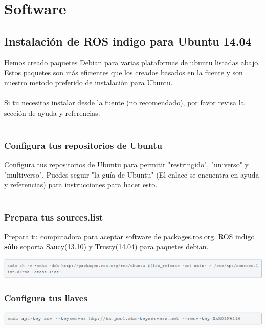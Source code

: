 \documentclass[a4paper]{book}
\begin{document}
\chapter{Software}

\section{Instalación de ROS indigo para Ubuntu 14.04}
Hemos creado paquetes Debian para varias plataformas de ubuntu listadas abajo. Estos paquetes son más eficientes que 
los creados basados en la fuente y son nuestro metodo preferido de instalación para Ubuntu.\\
\\
Si tu necesitas instalar desde la fuente (no recomendado), por favor revisa la sección de ayuda y referencias.\\
\\
\subsection{Configura tus repositorios de Ubuntu}
Configura tus repositorios de Ubuntu para permitir "restringido", "universo" y "multiverso". Puedes seguir "la guía de 
Ubuntu" (El enlace se encuentra en ayuda y referencias) para instrucciones para hacer esto.\\
\\
\subsection{Prepara tus sources.list}
Prepara tu computadora para aceptar software de packages.ros.org. ROS indigo \textbf{sólo} soporta Saucy(13.10) y 
Trusty(14.04) para paquetes debian.

\begin{center}
\includegraphics[width=1\textwidth]{Figures/Software/Install_ROS/Paso_1.png}
\end{center}

\subsection{Configura tus llaves}

\begin{center}
\includegraphics[width=1\textwidth]{Figures/Software/Install_ROS/Paso_2.png}
\end{center}
\end{document}
